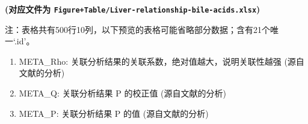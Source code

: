 \documentclass[
]{article}
\providecommand{\tightlist}{%
  \setlength{\itemsep}{0pt}\setlength{\parskip}{0pt}}
\begin{document}
\textbf{(对应文件为 \texttt{Figure+Table/Liver-relationship-bile-acids.xlsx})}

\begin{center}\begin{tcolorbox}[colback=gray!10, colframe=gray!50, width=0.9\linewidth, arc=1mm, boxrule=0.5pt]注：表格共有500行10列，以下预览的表格可能省略部分数据；含有21个唯一`.id'。
\end{tcolorbox}
\end{center}
\begin{center}\begin{tcolorbox}[colback=gray!10, colframe=gray!50, width=0.9\linewidth, arc=1mm, boxrule=0.5pt]\begin{enumerate}\tightlist
\item META\_Rho:  关联分析结果的关联系数，绝对值越大，说明关联性越强 (源自文献的分析)
\item META\_Q:  关联分析结果 P 的校正值 (源自文献的分析)
\item META\_P:  关联分析结果 P 的值 (源自文献的分析)
\end{enumerate}\end{tcolorbox}
\end{center}
\end{document}
